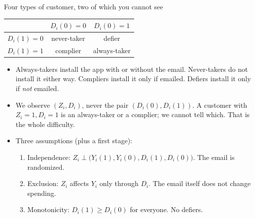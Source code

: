 \documentclass[aspectratio=169,11pt]{beamer}
\begin{document}
\begin{frame}{Four types of customer, two of which you cannot see}
\begin{center}
\begin{tabular}{r|cc}
 & $D_i(0) = 0$ & $D_i(0) = 1$ \\
\hline
$D_i(1) = 0$ & \alert{never-taker} & defier \\
$D_i(1) = 1$ & \alert{complier} & \alert{always-taker} \\
\end{tabular}
\end{center}
\begin{itemize}
	\item \alert{Always-takers} install the app with or without the email. \alert{Never-takers} do not install it
	either way. \alert{Compliers} install it only if emailed. \alert{Defiers} install it only if \emph{not} emailed.
	\medskip
	\item We observe $(Z_i, D_i)$, never the pair $(D_i(0), D_i(1))$. A customer with $Z_i = 1, D_i = 1$ is an
	always-taker or a complier; we cannot tell which. That is the whole difficulty.
	\medskip
	\item Three assumptions (plus a first stage):
	\begin{enumerate}
		\item \alert{Independence}: $Z_i \perp \big(Y_i(1), Y_i(0), D_i(1), D_i(0)\big)$. The email is randomized.
		\item \alert{Exclusion}: $Z_i$ affects $Y_i$ only through $D_i$. The email itself does not change spending.
		\item \alert{Monotonicity}: $D_i(1) \ge D_i(0)$ for everyone. No defiers.
	\end{enumerate}
\end{itemize}
\end{frame}
\end{document}
